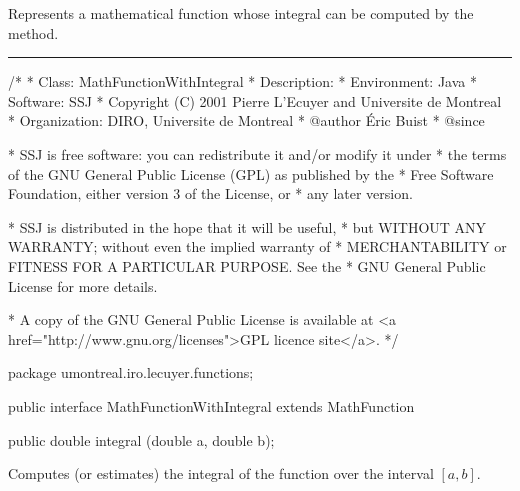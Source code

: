 
Represents a mathematical function whose
integral can be computed by the
 method.

\bigskip\hrule

\begin{code}
\begin{hide}
/*
 * Class:        MathFunctionWithIntegral
 * Description:
 * Environment:  Java
 * Software:     SSJ
 * Copyright (C) 2001  Pierre L'Ecuyer and Universite de Montreal
 * Organization: DIRO, Universite de Montreal
 * @author       Éric Buist
 * @since

 * SSJ is free software: you can redistribute it and/or modify it under
 * the terms of the GNU General Public License (GPL) as published by the
 * Free Software Foundation, either version 3 of the License, or
 * any later version.

 * SSJ is distributed in the hope that it will be useful,
 * but WITHOUT ANY WARRANTY; without even the implied warranty of
 * MERCHANTABILITY or FITNESS FOR A PARTICULAR PURPOSE.  See the
 * GNU General Public License for more details.

 * A copy of the GNU General Public License is available at
   <a href="http://www.gnu.org/licenses">GPL licence site</a>.
 */
\end{hide}
package umontreal.iro.lecuyer.functions;\begin{hide}

\end{hide}

public interface MathFunctionWithIntegral extends MathFunction\begin{hide} {
\end{hide}

   public double integral (double a, double b);\begin{hide}
}\end{hide}
\end{code}
\begin{tabb}
   Computes (or estimates) the integral of the
   function over the interval $[a, b]$.
\end{tabb}
\begin{htmlonly}
\end{htmlonly}
